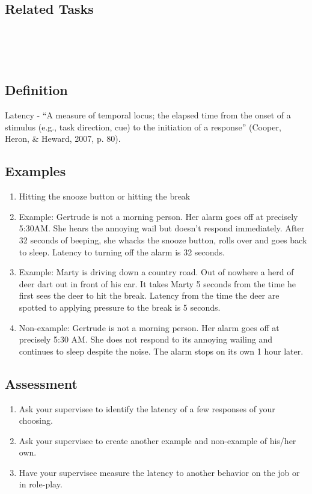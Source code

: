 \subsection{Related Tasks}
\fourhOne{}\\
\fouriOne{}\\
\fourFKFourtySeven{}\\
%
\subsection{Definition}  
Latency - ``A measure of temporal locus; the elapsed time from the onset of a stimulus (e.g., task direction, cue) to the initiation of a response'' (Cooper, Heron, \& Heward, 2007, p. 80).  

\subsection{Examples}
\begin{enumerate}
\item Hitting the snooze button or hitting the break
\item Example: Gertrude is not a morning person.  Her alarm goes off at precisely 5:30AM.  She hears the annoying wail but doesn't respond immediately.  After 32 seconds of beeping, she whacks the snooze button, rolls over and goes back to sleep.  Latency to turning off the alarm is 32 seconds.
\item Example:  Marty is driving down a country road.  Out of nowhere a herd of deer dart out in front of his car.  It takes Marty 5 seconds from the time he first sees the deer to hit the break.  Latency from the time the deer are spotted to applying pressure to the break is 5 seconds.    
\item Non-example: Gertrude is not a morning person.  Her alarm goes off at precisely 5:30 AM.  She does not respond to its annoying wailing and continues to sleep despite the noise.  The alarm stops on its own 1 hour later.
\end{enumerate}
%
\subsection{Assessment}
\begin{enumerate}
\item Ask your supervisee to identify the latency of a few responses of your choosing.  
\item Ask your supervisee to create another example and non-example of his/her own.
\item Have your supervisee measure the latency to another behavior on the job or in role-play.
\end{enumerate}
%

